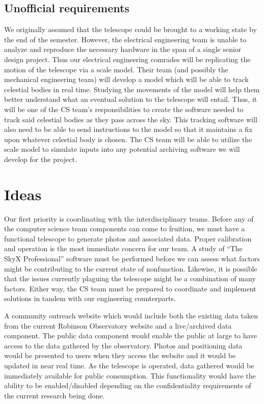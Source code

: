 \documentclass[12pt]{report}
\begin{document}
\subsection*{Unofficial requirements}

We originally assumed that the telescope could be brought to a working state by the end of the semester. However, the electrical engineering team is unable to analyze and reproduce the necessary hardware in the span of a single senior design project. Thus our electrical engineering comrades will be replicating the motion of the telescope via a scale model. Their team (and possibly the mechanical engineering team) will develop a model which will be able to track celestial bodies in real time. Studying the movements of the model will help them better understand what an eventual solution to the telescope will entail. Thus, it will be one of the CS team’s responsibilities to create the software needed to track said celestial bodies as they pass across the sky. This tracking software will also need to be able to send instructions to the model so that it maintains a fix upon whatever celestial body is chosen. The CS team will be able to utilize the scale model to simulate inputs into any potential archiving software we will develop for the project.

\section*{Ideas}

Our first priority is coordinating with the interdisciplinary teams. Before any of the computer science team components can come to fruition, we must have a functional telescope to generate photos and associated data. Proper calibration and operation is the most immediate concern for our team. A study of “The SkyX Professional” software must be performed before we can assess what factors might be contributing to the current state of nonfunction. Likewise, it is possible that the issues currently plaguing the telescope might be a combination of many factors. Either way, the CS team must be prepared to coordinate and implement solutions in tandem with our engineering counterparts.

A community outreach website which would include both the existing data taken from the current Robinson Observatory website and a live/archived data component. The public data component would enable the public at large to have access to the data gathered by the observatory. Photos and positioning data would be presented to users when they access the website and it would be updated in near real time. As the telescope is operated, data gathered would be immediately available for public consumption. This functionality would have the ability to be enabled/disabled depending on the confidentiality requirements of the current research being done.
\end{document}
